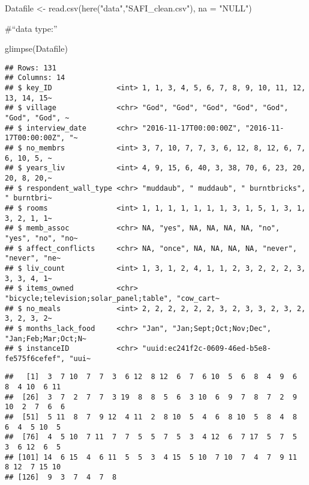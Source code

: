 \documentclass[
]{article}
\newenvironment{Shaded}{\begin{snugshade}}{\end{snugshade}}
\newcommand{\AttributeTok}[1]{\textcolor[rgb]{0.77,0.63,0.00}{#1}}
\newcommand{\FunctionTok}[1]{\textcolor[rgb]{0.00,0.00,0.00}{#1}}
\newcommand{\NormalTok}[1]{#1}
\newcommand{\OtherTok}[1]{\textcolor[rgb]{0.56,0.35,0.01}{#1}}
\newcommand{\SpecialCharTok}[1]{\textcolor[rgb]{0.00,0.00,0.00}{#1}}
\newcommand{\StringTok}[1]{\textcolor[rgb]{0.31,0.60,0.02}{#1}}
\begin{document}
\begin{Shaded}
\begin{Highlighting}[]
\NormalTok{Datafile }\OtherTok{\textless{}{-}} \FunctionTok{read.csv}\NormalTok{(}\FunctionTok{here}\NormalTok{(}\StringTok{"data"}\NormalTok{,}\StringTok{"SAFI\_clean.csv"}\NormalTok{), }\AttributeTok{na =} \StringTok{"NULL"}\NormalTok{)}
\end{Highlighting}
\end{Shaded}

\#``data type:''

\begin{Shaded}
\begin{Highlighting}[]
\FunctionTok{glimpse}\NormalTok{(Datafile)}
\end{Highlighting}
\end{Shaded}

\begin{verbatim}
## Rows: 131
## Columns: 14
## $ key_ID               <int> 1, 1, 3, 4, 5, 6, 7, 8, 9, 10, 11, 12, 13, 14, 15~
## $ village              <chr> "God", "God", "God", "God", "God", "God", "God", ~
## $ interview_date       <chr> "2016-11-17T00:00:00Z", "2016-11-17T00:00:00Z", "~
## $ no_membrs            <int> 3, 7, 10, 7, 7, 3, 6, 12, 8, 12, 6, 7, 6, 10, 5, ~
## $ years_liv            <int> 4, 9, 15, 6, 40, 3, 38, 70, 6, 23, 20, 20, 8, 20,~
## $ respondent_wall_type <chr> "muddaub", " muddaub", " burntbricks", " burntbri~
## $ rooms                <int> 1, 1, 1, 1, 1, 1, 1, 3, 1, 5, 1, 3, 1, 3, 2, 1, 1~
## $ memb_assoc           <chr> NA, "yes", NA, NA, NA, NA, "no", "yes", "no", "no~
## $ affect_conflicts     <chr> NA, "once", NA, NA, NA, NA, "never", "never", "ne~
## $ liv_count            <int> 1, 3, 1, 2, 4, 1, 1, 2, 3, 2, 2, 2, 3, 3, 3, 4, 1~
## $ items_owned          <chr> "bicycle;television;solar_panel;table", "cow_cart~
## $ no_meals             <int> 2, 2, 2, 2, 2, 2, 3, 2, 3, 3, 2, 3, 2, 3, 2, 3, 2~
## $ months_lack_food     <chr> "Jan", "Jan;Sept;Oct;Nov;Dec", "Jan;Feb;Mar;Oct;N~
## $ instanceID           <chr> "uuid:ec241f2c-0609-46ed-b5e8-fe575f6cefef", "uui~
\end{verbatim}

\begin{Shaded}
\end{Shaded}

\begin{verbatim}
##   [1]  3  7 10  7  7  3  6 12  8 12  6  7  6 10  5  6  8  4  9  6  8  4 10  6 11
##  [26]  3  7  2  7  7  3 19  8  8  5  6  3 10  6  9  7  8  7  2  9 10  2  7  6  6
##  [51]  5 11  8  7  9 12  4 11  2  8 10  5  4  6  8 10  5  8  4  8  6  4  5 10  5
##  [76]  4  5 10  7 11  7  7  5  5  7  5  3  4 12  6  7 17  5  7  5  3  6 12  6  5
## [101] 14  6 15  4  6 11  5  5  3  4 15  5 10  7 10  7  4  7  9 11  8 12  7 15 10
## [126]  9  3  7  4  7  8
\end{verbatim}
\end{document}
